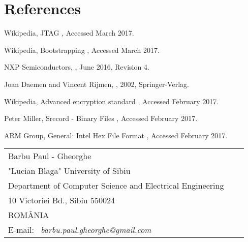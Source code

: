 \documentclass[10pt,a4paper,twoside]{article}
\begin{document}
\section{References}
\begin{thebibliography}{*}\label{Refences}
Wikipedia, \newblock JTAG , Accessed March 2017. \vspace{-7pt}

Wikipedia, \newblock Bootstrapping , Accessed March 2017. \vspace{-7pt}

NXP Semiconductors, , June 2016, \newblock Revision 4.\vspace{-7pt}

Joan Daemen and Vincent Rijmen, , 2002, \newblock Springer-Verlag. \vspace{-7pt}

Wikipedia, \newblock Advanced encryption standard , Accessed February 2017. \vspace{-7pt}

Peter Miller, \newblock Srecord - Binary Files , Accessed February 2017.\vspace{-7pt}

ARM Group, \newblock General: Intel Hex File Format , Accessed February 2017.\vspace{-7pt}

\end{thebibliography}

\vspace*{1cm} {\footnotesize
\begin{tabular*}{16cm}{p{4.2cm}p{4.2cm}p{4.2cm}}
Barbu Paul - Gheorghe & & \\
"Lucian Blaga" University of Sibiu &  &  \\
Department of Computer Science and Electrical Engineering &  & \\
 10 Victoriei Bd., Sibiu 550024 & & \\
ROMÂNIA & & \\
E-mail: \ {\it barbu.paul.gheorghe@gmail.com}& &

\end{tabular*}}
\end{document}
